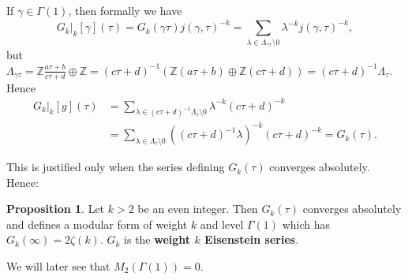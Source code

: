\documentclass{article}
\theoremstyle{definition}
\newtheorem{prop}[theorem]{Proposition}
\begin{document}
If $\gamma \in \Gamma(1)$, then formally we have $$G_k|_k[\gamma](\tau) = G_k(\gamma \tau)j(\gamma, \tau)^{-k} = \sum_{\lambda \in \Lambda_{\gamma \tau} \setminus 0}^{} \lambda^{-k} j(\gamma, \tau)^{-k},$$
but $\Lambda_{\gamma \tau} = \mathbb{Z} \frac{a \tau + b}{c \tau +d} \oplus \mathbb{Z} = (c \tau + d)^{-1}\left(\mathbb{Z}(a \tau + b) \oplus \mathbb{Z}(c \tau + d)\right) = (c \tau + d)^{-1} \Lambda_\tau$. Hence 
\begin{align*}
    G_k|_k[g](\tau) &= \sum_{\lambda \in (c \tau + d)^{-1} \Lambda_\tau \setminus 0}^{} \lambda^{-k} (c \tau +d)^{-k}\\ &= \sum_{\lambda \in \Lambda_\tau \setminus 0} ((c \tau + d)^{-1}\lambda)^{-k}(c \tau + d)^{-k} = G_k(\tau).
\end{align*}

This is justified only when the series defining $G_k(\tau)$ converges absolutely. Hence:
\begin{prop}
    Let $k > 2$ be an even integer. Then $G_k(\tau)$ converges absolutely and defines a modular form of weight $k$ and level $\Gamma(1)$ which has   $G_k(\infty) = 2\zeta(k)$. $G_k$ is the \textbf{weight $k$ Eisenstein series}.
\end{prop}
We will later see that $M_2(\Gamma(1)) = 0$.
\end{document}
